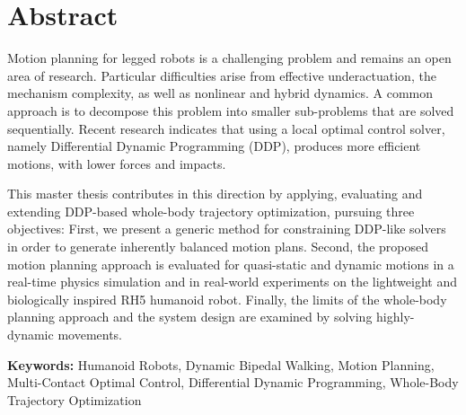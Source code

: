 \thispagestyle{empty}
\chapter*{Abstract}

Motion planning for legged robots is a challenging problem and remains an open area of research. Particular difficulties arise from effective underactuation, the mechanism complexity, as well as nonlinear and hybrid dynamics.
A common approach is to decompose this problem into smaller sub-problems that are solved sequentially. Recent research indicates that using a local optimal control solver, namely Differential Dynamic Programming (DDP), produces more efficient motions, with lower forces and impacts.

This master thesis contributes in this direction by applying, evaluating and extending DDP-based whole-body trajectory optimization, pursuing three objectives: 
First, we present a generic method for constraining DDP-like solvers in order to generate inherently balanced motion plans. 
Second, the proposed motion planning approach is evaluated for quasi-static and dynamic motions in a real-time physics simulation and in real-world experiments on the lightweight and biologically inspired RH5 humanoid robot.
Finally, the limits of the whole-body planning approach and the system design are examined by solving highly-dynamic movements. 

\vfill
\textbf{Keywords:} Humanoid Robots, Dynamic Bipedal Walking, Motion Planning, Multi-Contact Optimal Control, Differential Dynamic Programming, Whole-Body Trajectory Optimization  
 











